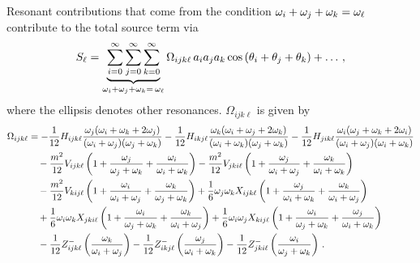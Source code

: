 \documentclass[../PhD.tex]{subfiles}
\newcommand{\thi}{\theta_i}
\newcommand{\thj}{\theta_j}
\newcommand{\thk}{\theta_k}
\begin{document}
Resonant contributions that come from the condition $\omega_i + \omega_j + \omega_k = \omega_\ell$ contribute to the total source term via
\begin{align}
S_\ell = \underbrace{\sum_{i=0}^\infty \sum_{j=0}^\infty \sum_{k=0}^\infty}_{\oi + \oj + \ok = \, \ol} \Omega_{ijk\ell} \, a_i a_j a_k \cos \left( \thi + \thj + \thk \right) + \ldots \, ,
\end{align}
where the ellipsis denotes other resonances. $\Omega_{ijk\ell}$ is given by
\begin{align}
\label{omega}
\Omega_{ijk\ell} &= -\frac{1}{12}H_{ijk\ell} \frac{\oj (\oi + \ok +2\oj)}{(\oi + \oj)(\oj + \ok)} - \frac{1}{12} H_{ikj\ell} \frac{\ok (\oi + \oj + 2\ok)}{(\oi + \ok)(\oj + \ok)}- \frac{1}{12} H_{jik\ell} \frac{\oi (\oj + \ok +2\oi)}{(\oi + \oj)(\oi + \ok)} \nonumber \\
%
& \quad - \frac{m^2}{12} V_{ijk\ell} \left( 1 + \frac{\oj}{\oj + \ok} + \frac{\oi}{\oi + \ok} \right) - \frac{m^2}{12} V_{jki\ell} \left( 1 + \frac{\oj}{\oi + \oj} + \frac{\ok}{\oi + \ok} \right) \nonumber \\
%
& \quad - \frac{m^2}{12} V_{kij\ell} \left( 1 + \frac{\oi}{\oi + \oj} + \frac{\ok}{\oj + \ok} \right)  + \frac{1}{6} \oj \ok X_{ijk\ell} \left( 1 + \frac{\oj}{\oi + \ok} + \frac{\ok}{\oi + \oj} \right) \nonumber \\
%
& \quad + \frac{1}{6} \oi \ok X_{jki\ell} \left( 1 + \frac{\oi}{\oj + \ok} + \frac{\ok}{\oi + \oj} \right) + \frac{1}{6} \oi \oj X_{kij\ell} \left( 1 + \frac{\oi}{\oj + \ok} + \frac{\oj}{\oi + \ok} \right) \nonumber \\
%
& \quad - \frac{1}{12} Z^-_{ijk\ell} \left( \frac{\ok}{\oi + \oj} \right) - \frac{1}{12} Z^-_{ikj\ell} \left( \frac{\oj}{\oi + \ok} \right) - \frac{1}{12} Z^-_{jki\ell}  \left( \frac{\oi}{\oj + \ok} \right) \, .
\end{align}
\end{document}

